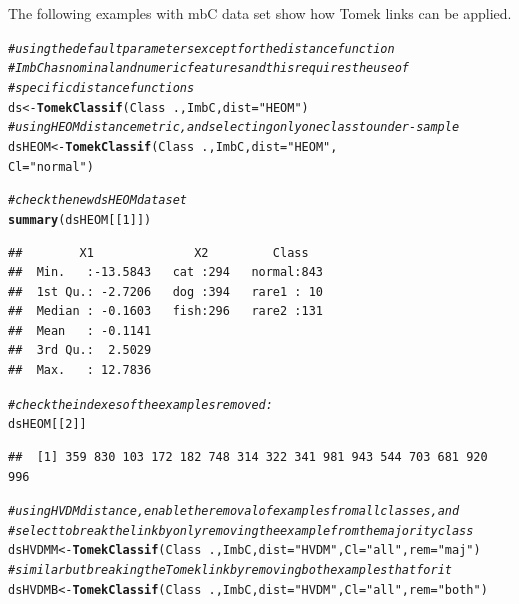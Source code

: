 \documentclass[10pt,a4paper]{article}\usepackage[]{graphicx}\usepackage[]{color}
\makeatletter
\newcommand{\hlnum}[1]{\textcolor[rgb]{0.686,0.059,0.569}{#1}}%
\newcommand{\hlstr}[1]{\textcolor[rgb]{0.192,0.494,0.8}{#1}}%
\newcommand{\hlcom}[1]{\textcolor[rgb]{0.678,0.584,0.686}{\textit{#1}}}%
\newcommand{\hlopt}[1]{\textcolor[rgb]{0,0,0}{#1}}%
\newcommand{\hlstd}[1]{\textcolor[rgb]{0.345,0.345,0.345}{#1}}%
\newcommand{\hlkwb}[1]{\textcolor[rgb]{0.69,0.353,0.396}{#1}}%
\newcommand{\hlkwc}[1]{\textcolor[rgb]{0.333,0.667,0.333}{#1}}%
\newcommand{\hlkwd}[1]{\textcolor[rgb]{0.737,0.353,0.396}{\textbf{#1}}}%
\newenvironment{kframe}{%
 \def\at@end@of@kframe{}%
 \ifinner\ifhmode%
  \def\at@end@of@kframe{\end{minipage}}%
  \begin{minipage}{\columnwidth}%
 \fi\fi%
 \def\FrameCommand##1{\hskip\@totalleftmargin \hskip-\fboxsep
 \colorbox{shadecolor}{##1}\hskip-\fboxsep
     \hskip-\linewidth \hskip-\@totalleftmargin \hskip\columnwidth}%
 \MakeFramed {\advance\hsize-\width
   \@totalleftmargin\z@ \linewidth\hsize
   \@setminipage}}%
 {\par\unskip\endMakeFramed%
 \at@end@of@kframe}
\newenvironment{knitrout}{}{} %
\makeatother
\begin{document}
The following examples with mbC data set show how Tomek links can be applied.

\begin{knitrout}\footnotesize
{}\color{fgcolor}\begin{kframe}
\begin{alltt}
\hlcom{# using the default parameters except for the distance function}
\hlcom{# ImbC has nominal and numeric features and this requires the use of }
\hlcom{# specific distance functions}
  \hlstd{ds} \hlkwb{<-} \hlkwd{TomekClassif}\hlstd{(Class}\hlopt{~}\hlstd{., ImbC,} \hlkwc{dist}\hlstd{=}\hlstr{"HEOM"}\hlstd{)}
\hlcom{# using HEOM distance metric, and selecting only one class to under-sample}
  \hlstd{dsHEOM} \hlkwb{<-} \hlkwd{TomekClassif}\hlstd{(Class}\hlopt{~}\hlstd{., ImbC,} \hlkwc{dist}\hlstd{=}\hlstr{"HEOM"}\hlstd{,}
                         \hlkwc{Cl}\hlstd{=}\hlstr{"normal"}\hlstd{)}

\hlcom{# check the new dsHEOM data set}
  \hlkwd{summary}\hlstd{(dsHEOM[[}\hlnum{1}\hlstd{]])}
\end{alltt}
\begin{verbatim}
##        X1              X2         Class    
##  Min.   :-13.5843   cat :294   normal:843  
##  1st Qu.: -2.7206   dog :394   rare1 : 10  
##  Median : -0.1603   fish:296   rare2 :131  
##  Mean   : -0.1141                          
##  3rd Qu.:  2.5029                          
##  Max.   : 12.7836
\end{verbatim}
\begin{alltt}
\hlcom{# check the indexes of the examples removed:}
  \hlstd{dsHEOM[[}\hlnum{2}\hlstd{]]}
\end{alltt}
\begin{verbatim}
##  [1] 359 830 103 172 182 748 314 322 341 981 943 544 703 681 920 996
\end{verbatim}
\begin{alltt}
\hlcom{# using HVDM distance, enable the removal of examples from all classes, and}
\hlcom{# select to break the link by only removing the example from the majority class}
  \hlstd{dsHVDMM} \hlkwb{<-} \hlkwd{TomekClassif}\hlstd{(Class}\hlopt{~}\hlstd{., ImbC,} \hlkwc{dist}\hlstd{=}\hlstr{"HVDM"}\hlstd{,} \hlkwc{Cl}\hlstd{=}\hlstr{"all"}\hlstd{,} \hlkwc{rem}\hlstd{=}\hlstr{"maj"}\hlstd{)}
\hlcom{# similar but breaking the Tomek link by removing both examples that for it}
  \hlstd{dsHVDMB} \hlkwb{<-} \hlkwd{TomekClassif}\hlstd{(Class}\hlopt{~}\hlstd{., ImbC,} \hlkwc{dist}\hlstd{=}\hlstr{"HVDM"}\hlstd{,} \hlkwc{Cl}\hlstd{=}\hlstr{"all"}\hlstd{,} \hlkwc{rem}\hlstd{=}\hlstr{"both"}\hlstd{)}
\end{alltt}
\end{kframe}
\end{knitrout}
\end{document}
